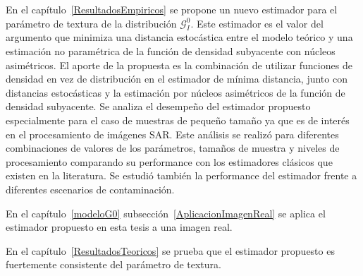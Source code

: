 En el capítulo~\ref{ResultadosEmpiricos} se propone un nuevo estimador para el parámetro de textura de la distribución $\mathcal{G}_I^0$. Este estimador es el valor del argumento que minimiza una distancia estocástica entre el modelo teórico y una estimación no paramétrica de la función de densidad subyacente con núcleos asimétricos. El aporte de la propuesta es la combinación de utilizar funciones de densidad en vez de distribución en el estimador de mínima distancia, junto con distancias estocásticas y la estimación por núcleos asimétricos de la función de densidad subyacente. Se analiza el desempeño del estimador propuesto especialmente para el caso de muestras de pequeño tamaño ya que es de interés en el procesamiento de imágenes SAR. Este análisis se realizó para diferentes combinaciones de valores de los parámetros, tamaños de muestra y niveles de procesamiento comparando su performance con los estimadores clásicos que existen en la literatura. Se estudió también la performance del estimador frente a diferentes escenarios de contaminación.

En el capítulo~\ref{modeloG0} subsección~\ref{AplicacionImagenReal} se aplica el estimador propuesto en esta tesis a una imagen real.

En el capítulo~\ref{ResultadosTeoricos} se prueba que el estimador propuesto es fuertemente consistente del parámetro de textura.
	